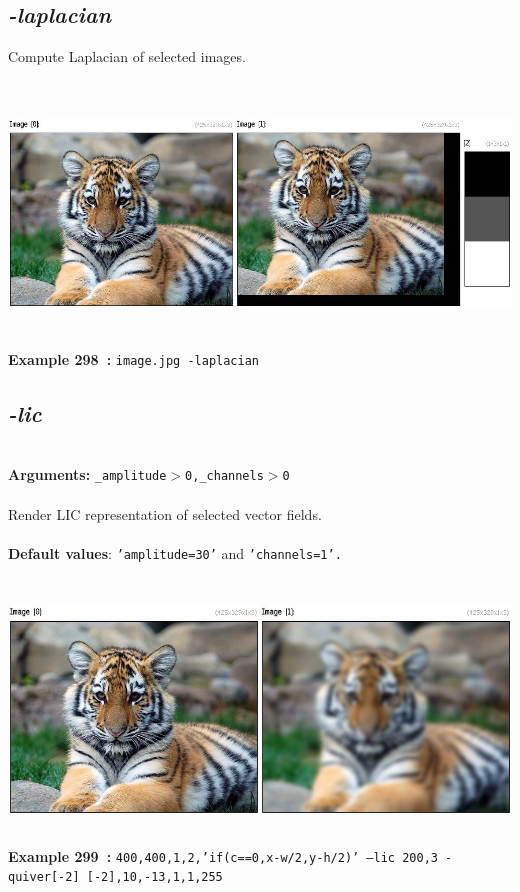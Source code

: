 \documentclass[a4paper,11pt,twoside]{book}
\begin{document}
\subsection{\emph{-laplacian} }\vspace*{-0.5em}
Compute Laplacian of selected images.
\begin{center}\includegraphics[keepaspectratio=true,height=7cm,width=\textwidth]{img/gmic_def298.jpg}\\
{\footnotesize \textbf{Example 298~:} \texttt{image.jpg -laplacian}}
\end{center}

\subsection{\emph{-lic} }\vspace*{-0.5em}
~\\\textbf{Arguments: } 
{\small \texttt{\_amplitude$>$0,\_channels$>$0}}\\~\\
Render LIC representation of selected vector fields.
~\\~\\\textbf{Default values}: {\small \texttt{'amplitude=30'} and \texttt{'channels=1'.}}
\begin{center}\includegraphics[keepaspectratio=true,height=7cm,width=\textwidth]{img/gmic_def299.jpg}\\
{\footnotesize \textbf{Example 299~:} \texttt{400,400,1,2,'if(c==0,x-w/2,y-h/2)' --lic 200,3 -quiver[-2] [-2],10,-13,1,1,255}}
\end{center}
\end{document}
